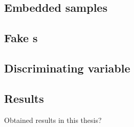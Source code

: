 \subsection*{Embedded samples}


\subsection*{Fake \tauh s}


\subsection*{Discriminating variable}


\subsection*{Results}

\begin{frame}
\begin{center}
\LARGE Obtained results in this thesis?
\end{center}
\end{frame}

